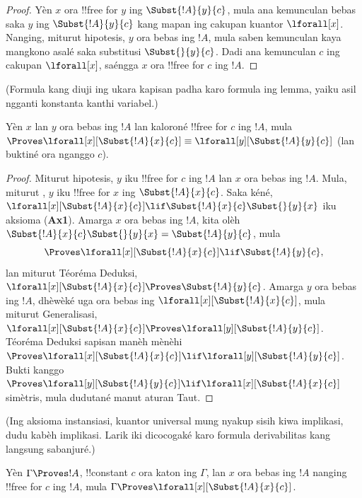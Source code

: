 \documentclass[../../../include/open-logic-section]{subfiles}
\begin{document}
\begin{proof} Yèn $x$ ora !!{free for} $y$ ing
$\Subst{!A}{y}{c}$, mula ana kemunculan bebas saka $y$ ing
$\Subst{!A}{y}{c}$ kang mapan ing cakupan kuantor
$\lforall[x]$. Nanging, miturut hipotesis, $y$ ora bebas
ing $!A$, mula saben kemunculan kaya mangkono asalé saka
substitusi $\Subst{}{y}{c}$. Dadi ana kemunculan $c$
ing cakupan $\lforall[x]$, saéngga $x$ ora
!!{free for} $c$ ing $!A$.
\end{proof}
(Formula kang diuji ing ukara kapisan padha karo formula ing lemma, yaiku asil ngganti konstanta kanthi variabel.)

\begin{lem}
Yèn $x$ lan $y$ ora bebas ing $!A$ lan kaloroné
!!{free for} $c$ ing $!A$, mula
$\Proves \lforall[x][\Subst{!A}{x}{c}] \equiv
\lforall[y][\Subst{!A}{y}{c}]$ (lan buktiné ora nganggo $c$).
\end{lem}

\begin{proof} 
Miturut hipotesis, $y$ iku !!{free for} $c$ ing $!A$ lan $x$
ora bebas ing $!A$. Mula, miturut , $y$
iku !!{free for} $x$ ing $\Subst{!A}{x}{c}$. Saka kéné,
$\lforall[x][\Subst{!A}{x}{c}] \lif \Subst{!A}{x}{c} \Subst{}{y}{x}$
iku aksioma (\textbf{Ax1}). Amarga $x$ ora bebas ing $!A$,
kita olèh $\Subst{!A}{x}{c} \Subst{}{y}{x} = \Subst{!A}{y}{c}$,
mula
\[
\Proves \lforall[x][\Subst{!A}{x}{c}] \lif \Subst{!A}{y}{c}, 
\] 
lan miturut Téoréma Deduksi,
$\lforall[x][\Subst{!A}{x}{c}] \Proves \Subst{!A}{y}{c}$.
Amarga $y$ ora bebas ing $!A$, dhèwèké uga ora bebas ing
$\lforall[x][\Subst{!A}{x}{c}]$, mula miturut Generalisasi,
$\lforall[x][\Subst{!A}{x}{c}] \Proves \lforall[y][\Subst{!A}{y}{c}]$.
Téoréma Deduksi sapisan manèh mènèhi $\Proves
\lforall[x][\Subst{!A}{x}{c}] \lif \lforall[y][\Subst{!A}{y}{c}]$.
Bukti kanggo $\Proves \lforall[y][\Subst{!A}{y}{c}] \lif \lforall[x]
[\Subst{!A}{x}{c}]$ simètris, mula dudutané manut aturan Taut.
\end{proof}
(Ing aksioma instansiasi, kuantor universal mung nyakup sisih kiwa implikasi, dudu kabèh implikasi. Larik iki dicocogaké karo formula derivabilitas kang langsung sabanjuré.)

\begin{thm}
Yèn $\Gamma \Proves !A$, !!{constant} $c$ ora katon ing
$\Gamma$, lan $x$ ora bebas ing $!A$ nanging !!{free for}
$c$ ing $!A$, mula $\Gamma \Proves
\lforall[x][\Subst{!A}{x}{c}]$.
\end{thm}
\end{document}
